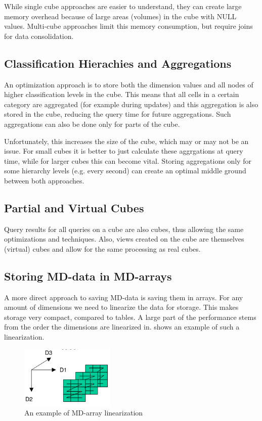 \documentclass{article}
\begin{document}
While single cube approaches are easier to understand, they can create large memory overhead because of large areas (volumes) in the cube with NULL values.
Multi-cube approaches limit this memory consumption, but require joins for data consolidation.

\subsection{Classification Hierachies and Aggregations}
An optimization approach is to store both the dimension values and all nodes of higher classification levels in the cube.
This means that all cells in a certain category are aggregated (for example during updates) and this aggregation is also stored in the cube, reducing the query time for future aggregations.
Such aggregations can also be done only for parts of the cube.

Unfortunately, this increases the size of the cube, which may or may not be an issue.
For small cubes it is better to just calculate these aggrgations at query time, while for larger cubes this can become vital.
Storing aggregations only for some hierarchy levels (e.g. every second) can create an optimal middle ground between both approaches.

\subsection{Partial and Virtual Cubes}
Query results for all queries on a cube are also cubes, thus allowing the same optimizations and techniques.
Also, views created on the cube are themselves (virtual) cubes and allow for the same processing as real cubes.

\subsection{Storing MD-data in MD-arrays}
A more direct approach to saving MD-data is saving them in arrays.
For any amount of dimensions we need to linearize the data for storage.
This makes storage very compact, compared to tables.
A large part of the performance stems from the order the dimensions are linearized in.
 shows an example of such a linearization.

\begin{figure}[h]
    \centering
    \includegraphics[width=0.4\textwidth]{linearization.png}
    \caption{An example of MD-array linearization}
    \label{fig:linearization}
\end{figure}
\end{document}
